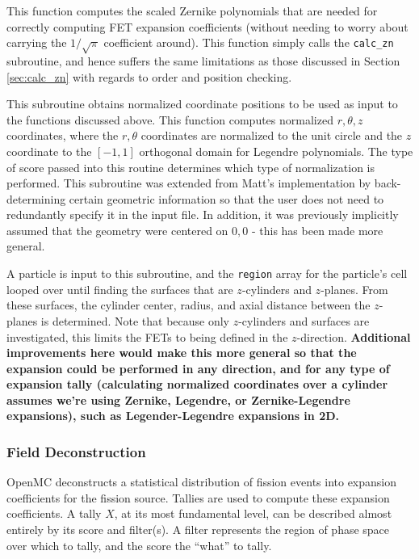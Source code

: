 \documentclass[10pt]{article}
\newcounter{subsubsubsection}[subsubsection]
\numberwithin{equation}{section} %
\begin{document}
This function computes the scaled Zernike polynomials that are needed for correctly computing FET expansion coefficients (without needing to worry about carrying the \(1/\sqrt{\pi}\) coefficient around). This function simply calls the {\tt calc\_zn} subroutine, and hence suffers the same limitations as those discussed in Section \ref{sec:calc_zn} with regards to order and position checking.

This subroutine obtains normalized coordinate positions to be used as input to the functions discussed above. This function computes normalized \(r, \theta, z\) coordinates, where the \(r, \theta\) coordinates are normalized to the unit circle and the \(z\) coordinate to the \([-1, 1]\) orthogonal domain for Legendre polynomials. The type of score passed into this routine determines which type of normalization is performed. This subroutine was extended from Matt's implementation by back-determining certain geometric information so that the user does not need to redundantly specify it in the input file. In addition, it was previously implicitly assumed that the geometry were centered on \(0, 0\) - this has been made more general. 

A particle is input to this subroutine, and the {\tt region} array for the particle's cell looped over until finding the surfaces that are \(z\)-cylinders and \(z\)-planes. From these surfaces, the cylinder center, radius, and axial distance between the \(z\)-planes is determined. Note that because only \(z\)-cylinders and surfaces are investigated, this limits the FETs to being defined in the \(z\)-direction. {\bf Additional improvements here would make this more general so that the expansion could be performed in any direction, and for any type of expansion tally (calculating normalized coordinates over a cylinder assumes we're using Zernike, Legendre, or Zernike-Legendre expansions), such as Legender-Legendre expansions in 2D.}

\subsubsection{Field Deconstruction}
OpenMC deconstructs a statistical distribution of fission events into expansion coefficients for the fission source. Tallies are used to compute these expansion coefficients. A tally \(X\), at its most fundamental level, can be described almost entirely by its score and filter(s). A filter represents the region of phase space over which to tally, and the score the ``what'' to tally. 
\end{document}
